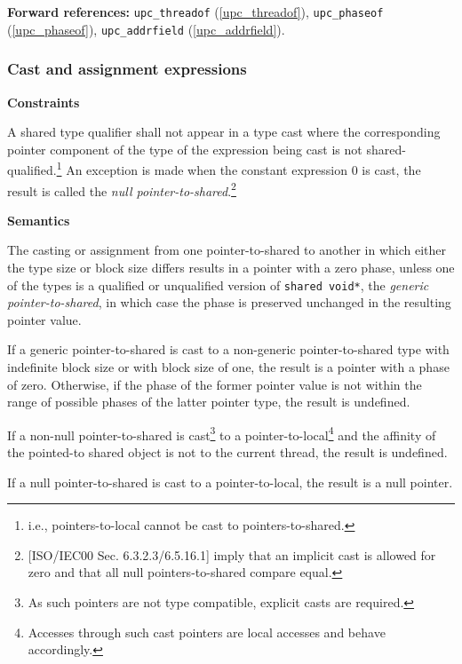 {\bf Forward references:}  {\tt upc\_threadof} (\ref{upc_threadof}),
          {\tt upc\_phaseof} (\ref{upc_phaseof}), {\tt upc\_addrfield} (\ref{upc_addrfield}). 

\subsubsection{Cast and assignment expressions}

{\bf Constraints} 

\npf A shared type qualifier shall not appear in a type cast
    where the corresponding pointer component of the type of the expression
    being cast is not shared-qualified.\footnote{i.e., pointers-to-local
    cannot be cast to pointers-to-shared.}  An exception is made when the constant
    expression 0 is cast, the result is called the {\em null 
    pointer-to-shared}.\footnote{[ISO/IEC00 Sec.
    6.3.2.3/6.5.16.1] imply that an implicit cast is allowed for zero
    and that all null pointers-to-shared compare equal.}

{\bf Semantics} 

\np The casting or assignment from one pointer-to-shared 
    to another in which either the type size or block size differs results  in 
    a pointer with a zero phase, unless one of the types is a qualified or
    unqualified version of {\tt shared void*}, the {\em generic pointer-to-shared},
    in which case the phase is preserved unchanged in the resulting
    pointer value.
    
\np If a generic pointer-to-shared is cast to a non-generic 
     pointer-to-shared type with indefinite block size or with block size of 
     one, the result is a pointer with a phase of zero.  Otherwise, if the
     phase of the former pointer value is not within the range of possible
     phases of the latter pointer type, the result is undefined.
  
\np If a non-null pointer-to-shared is cast\footnote{As such pointers
     are not type compatible, explicit casts are required.} to a
     pointer-to-local\footnote{Accesses through such cast pointers are
     local accesses and behave accordingly.} and the affinity
     of the pointed-to shared object is not to the current thread, the result is
     undefined.
     
\np If a null pointer-to-shared is cast to a pointer-to-local,
     the result is a null pointer.    
       
